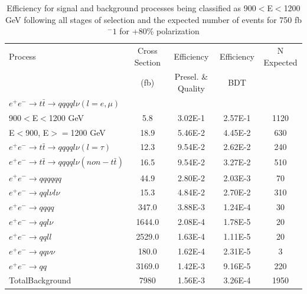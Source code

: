 \begin{table}
  \centering
  \begin{tabular}{l | c | c | c | c}
    \toprule
    Process     & Cross Section & Efficiency & Efficiency & N Expected\\
         & (fb) & Presel. \& Quality & BDT & \\
    \midrule
    $e^+e^-\rightarrow t\bar{t} \rightarrow qqqql\nu (l=e,\mu)$ &  & \\
    900$<$E$<$1200 GeV & 5.8 & 3.02E-1 & 2.57E-1 & 1120\\
    E$<$900, E$>=$1200 GeV & 18.9 & 5.46E-2& 4.45E-2& 630\\
   \midrule
    $e^+e^-\rightarrow t\bar{t} \rightarrow qqqql\nu (l=\tau)$& 12.3 & 9.54E-2 & 2.62E-2& 240\\
    \midrule
    $e^+e^-\rightarrow t\bar{t} \rightarrow qqqql\nu (non-t\bar{t})$& 16.5 & 9.54E-2 & 3.27E-2 & 510\\
    \midrule
    $e^+e^-\rightarrow qqqqqq$ & 44.9 & 2.80E-2 & 2.03E-3 & 70 \\
    \midrule
    $e^+e^-\rightarrow qql\nu l\nu$ & 15.3  & 4.84E-2 & 2.70E-2 & 310 \\
    \midrule
    $e^+e^-\rightarrow qqqq$ & 347.0 & 3.88E-3 & 1.24E-4 & 30 \\
    \midrule
    $e^+e^-\rightarrow qql\nu$ & 1644.0 & 2.08E-4& 1.78E-5 & 20\\
    \midrule
    $e^+e^-\rightarrow qqll$ & 2529.0 & 1.63E-4 & 1.11E-5 & 20 \\
    \midrule
    $e^+e^-\rightarrow qq\nu\nu$ & 180.0 & 1.62E-4 & 2.31E-5 & 3 \\
    \midrule
    $e^+e^-\rightarrow qq$ & 3169.0 & 1.42E-3 & 9.16E-5 & 220 \\
    \midrule
    \midrule
    TotalBackground & 7980 & 1.56E-3& 3.26E-4&  1950 \\
    \bottomrule
  \end{tabular}
  \caption{Efficiency for signal and background processes being classified as 900$<$E$<$1200 GeV following all stages of selection and the expected number of events for 750 fb$^-1$ for +80\% polarization}
  \label{table:topfinalefficienciesposMidE}
\end{table}


